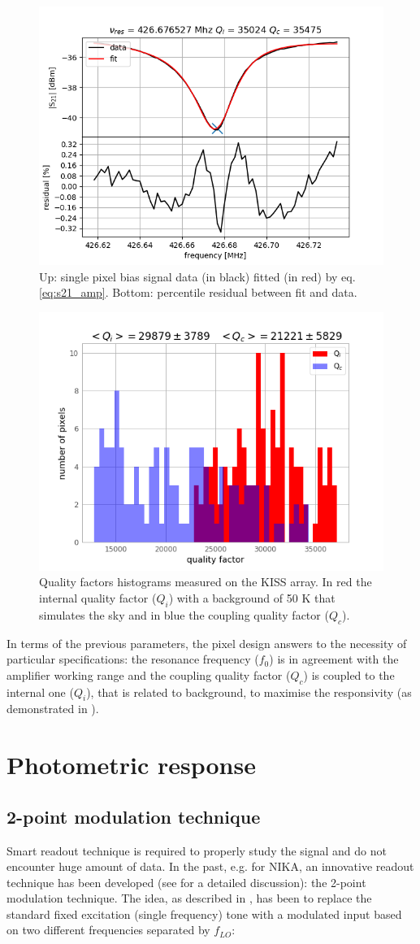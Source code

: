\documentclass[twocolumn,traditabstract]{aa}\\
\begin{document}
\begin{figure}[htf]
	\centering
	\includegraphics[width=.5\textwidth]{3.acqui/resonance_fit.png}
	\caption{Up: single pixel bias signal data (in black) fitted (in red) by eq. \ref{eq:s21_amp}. Bottom: percentile residual between fit and data.}
	\label{fig:fit_amp}
\end{figure}

\begin{figure}[htf]
	\centering
	\includegraphics[width=.5\textwidth]{3.acqui/Q_hist.png}
	\caption{Quality factors histograms measured on the KISS array. In red the internal quality factor ($Q_i$) with a background of 50 K that simulates the sky and in blue the coupling quality factor ($Q_c$).}
	\label{fig:hist}
\end{figure}

\noindent In terms of the previous parameters, the pixel design answers to the necessity of particular specifications: the resonance frequency ($f_0$) is in agreement with the amplifier working range and the coupling quality factor ($Q_c$) is coupled to the internal one ($Q_i$), that is related to background, to maximise the responsivity (as demonstrated in \cite{Gao}).

\section{Photometric response}
\label{sec:photo}

\subsection{2-point modulation technique}
\label{2-point}
Smart readout technique is required to properly study the signal and do not encounter huge amount of data. In the past, e.g. for NIKA, an innovative readout technique has been developed (see \cite{Calvo2013} for a detailed discussion): the 2-point modulation technique.
The idea, as described in \cite{Catalano2014} , has been to replace the standard fixed excitation (single frequency) tone with a modulated input based on two different frequencies separated by $f_{LO}$: 
\end{document}
